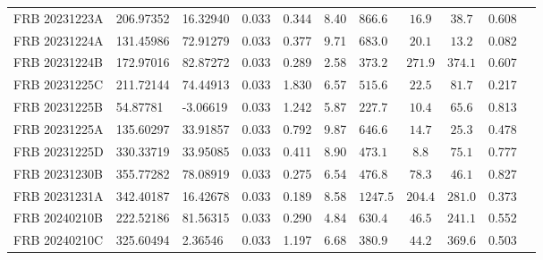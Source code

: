 \begin{longtable}{lllllllccll}
FRB 20231223A & 206.97352 & 16.32940 & 0.033 & 0.344 & 8.40 & $866.6$ & $16.9$ & $38.7$ & 0.608 \\
FRB 20231224A & 131.45986 & 72.91279 & 0.033 & 0.377 & 9.71 & $683.0$ & $20.1$ & $13.2$ & 0.082 \\
FRB 20231224B & 172.97016 & 82.87272 & 0.033 & 0.289 & 2.58 & $373.2$ & $271.9$ & $374.1$ & 0.607 \\
FRB 20231225C & 211.72144 & 74.44913 & 0.033 & 1.830 & 6.57 & $515.6$ & $22.5$ & $81.7$ & 0.217 \\
FRB 20231225B & 54.87781 & -3.06619 & 0.033 & 1.242 & 5.87 & $227.7$ & $10.4$ & $65.6$ & 0.813 \\
FRB 20231225A & 135.60297 & 33.91857 & 0.033 & 0.792 & 9.87 & $646.6$ & $14.7$ & $25.3$ & 0.478 \\
FRB 20231225D & 330.33719 & 33.95085 & 0.033 & 0.411 & 8.90 & $473.1$ & $8.8$ & $75.1$ & 0.777 \\
FRB 20231230B & 355.77282 & 78.08919 & 0.033 & 0.275 & 6.54 & $476.8$ & $78.3$ & $46.1$ & 0.827 \\
FRB 20231231A & 342.40187 & 16.42678 & 0.033 & 0.189 & 8.58 & $1247.5$ & $204.4$ & $281.0$ & 0.373 \\
FRB 20240210B & 222.52186 & 81.56315 & 0.033 & 0.290 & 4.84 & $630.4$ & $46.5$ & $241.1$ & 0.552 \\
FRB 20240210C & 325.60494 & 2.36546 & 0.033 & 1.197 & 6.68 & $380.9$ & $44.2$ & $369.6$ & 0.503 \\
\end{longtable}
